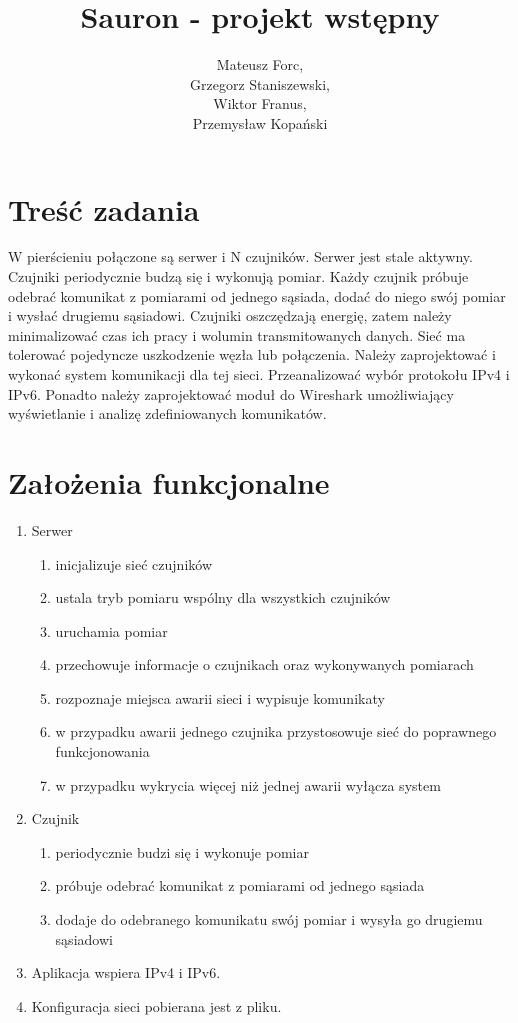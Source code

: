 \documentclass[a4paper,11pt]{article}
\title{Sauron - projekt wstępny}
\author{Mateusz Forc, \\ Grzegorz Staniszewski, \\ Wiktor Franus, \\ Przemysław Kopański}
\begin{document}

\maketitle
\tableofcontents

\newpage
\section{Treść zadania}
W pierścieniu połączone są serwer i N czujników.
Serwer jest stale aktywny. Czujniki periodycznie budzą się i wykonują pomiar.
Każdy czujnik próbuje odebrać komunikat z pomiarami od jednego sąsiada,
dodać do niego swój pomiar i wysłać drugiemu sąsiadowi.
Czujniki oszczędzają energię, zatem należy minimalizować czas ich pracy i wolumin
transmitowanych danych.
Sieć ma tolerować pojedyncze uszkodzenie węzła lub połączenia.
Należy zaprojektować i wykonać system komunikacji dla tej sieci.
Przeanalizować wybór protokołu IPv4 i IPv6.
Ponadto należy zaprojektować moduł do Wireshark umożliwiający wyświetlanie i analizę
zdefiniowanych komunikatów.

\section{Założenia funkcjonalne}

\begin{enumerate}
  \item Serwer
  \begin{enumerate}
    \item inicjalizuje sieć czujników
    \item ustala tryb pomiaru wspólny dla wszystkich czujników
    \item uruchamia pomiar
    \item przechowuje informacje o czujnikach oraz wykonywanych pomiarach
    \item rozpoznaje miejsca awarii sieci i wypisuje komunikaty
    \item w przypadku awarii jednego czujnika przystosowuje sieć do poprawnego funkcjonowania
    \item w przypadku wykrycia więcej niż jednej awarii wyłącza system
  \end{enumerate}
  \item Czujnik
  \begin{enumerate}
    \item periodycznie budzi się i wykonuje pomiar
    \item próbuje odebrać komunikat z pomiarami od jednego sąsiada
    \item dodaje do odebranego komunikatu swój pomiar i wysyła go drugiemu sąsiadowi
  \end{enumerate}
  \item Aplikacja wspiera IPv4 i IPv6.
  \item Konfiguracja sieci pobierana jest z pliku.
\end{enumerate}
\end{document}

